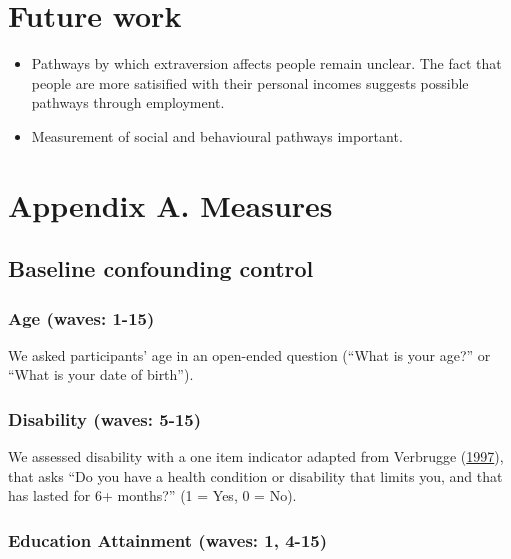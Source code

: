 \documentclass[
  singlecolumn]{report}
\providecommand{\tightlist}{%
  \setlength{\itemsep}{0pt}\setlength{\parskip}{0pt}}\usepackage{longtable,booktabs,array}
\begin{document}
\hypertarget{future-work}{%
\section{Future work}\label{future-work}}

\begin{itemize}
\tightlist
\item
  Pathways by which extraversion affects people remain unclear. The fact
  that people are more satisified with their personal incomes suggests
  possible pathways through employment.
\item
  Measurement of social and behavioural pathways important.
\end{itemize}

\newpage{}

\newpage{}

\hypertarget{appendix-a.-measures}{%
\section{Appendix A. Measures}\label{appendix-a.-measures}}

\hypertarget{baseline-confounding-control}{%
\subsection{Baseline confounding
control}\label{baseline-confounding-control}}

\hypertarget{age-waves-1-15}{%
\subsubsection{Age (waves: 1-15)}\label{age-waves-1-15}}

We asked participants' age in an open-ended question (``What is your
age?'' or ``What is your date of birth'').

\hypertarget{disability-waves-5-15}{%
\subsubsection{Disability (waves: 5-15)}\label{disability-waves-5-15}}

We assessed disability with a one item indicator adapted from Verbrugge
(\protect\hyperlink{ref-verbrugge1997}{1997}), that asks ``Do you have a
health condition or disability that limits you, and that has lasted for
6+ months?'' (1 = Yes, 0 = No).

\hypertarget{education-attainment-waves-1-4-15}{%
\subsubsection{Education Attainment (waves: 1,
4-15)}\label{education-attainment-waves-1-4-15}}
\end{document}

